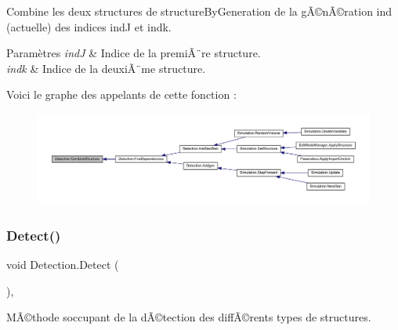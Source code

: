 Combine les deux structures de structure\+By\+Generation de la gÃ©nÃ©ration ind (actuelle) des indices indJ et indk. 


\begin{DoxyParams}{Paramètres}
{\em indJ} & Indice de la premiÃ¨re structure.\\
\hline
{\em indk} & Indice de la deuxiÃ¨me structure.\\
\hline
\end{DoxyParams}
Voici le graphe des appelants de cette fonction \+:
\nopagebreak
\begin{figure}[H]
\begin{center}
\leavevmode
\includegraphics[width=350pt]{class_detection_a7a133b5ef43e949260afb4685766e0ca_icgraph}
\end{center}
\end{figure}
\mbox{\label{class_detection_a2d43ae8dc03c4247fd0d39787b72213a}} 
\subsubsection{\texorpdfstring{Detect()}{Detect()}}
{\footnotesize\ttfamily void Detection.\+Detect (\begin{DoxyParamCaption}{ }\end{DoxyParamCaption})\hspace{0.3cm}{\ttfamily [inline]}, {\ttfamily [private]}}



MÃ©thode s\textquotesingle{}occupant de la dÃ©tection des diffÃ©rents types de structures. 

